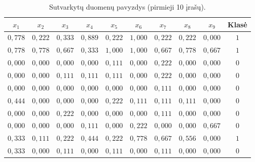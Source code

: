 \begin{table}[H]
    \centering
    \caption{Sutvarkytų duomenų pavyzdys (pirmieji 10 įrašų).}
    \begin{tabular}{|c|c|c|c|c|c|c|c|c|c|}
        \hline
        $x_1$ & $x_2$ & $x_3$ & $x_4$ & $x_5$ & $x_6$ & $x_7$ & $x_8$ & $x_9$ & Klasė \\
        \hline
        $0{,}778$ & $0{,}222$ & $0{,}333$ & $0{,}889$ & $0{,}222$ & $1{,}000$ & $0{,}222$ & $0{,}222$ & $0{,}000$ & $1$ \\ \hline
        $0{,}778$ & $0{,}778$ & $0{,}667$ & $0{,}333$ & $1{,}000$ & $1{,}000$ & $0{,}667$ & $0{,}778$ & $0{,}667$ & $1$ \\ \hline
        $0{,}000$ & $0{,}000$ & $0{,}000$ & $0{,}000$ & $0{,}111$ & $0{,}000$ & $0{,}222$ & $0{,}000$ & $0{,}000$ & $0$ \\ \hline
        $0{,}000$ & $0{,}000$ & $0{,}111$ & $0{,}111$ & $0{,}111$ & $0{,}000$ & $0{,}222$ & $0{,}000$ & $0{,}000$ & $0$ \\ \hline
        $0{,}000$ & $0{,}000$ & $0{,}000$ & $0{,}000$ & $0{,}000$ & $0{,}000$ & $0{,}111$ & $0{,}000$ & $0{,}000$ & $0$ \\ \hline
        $0{,}444$ & $0{,}000$ & $0{,}000$ & $0{,}000$ & $0{,}222$ & $0{,}111$ & $0{,}111$ & $0{,}111$ & $0{,}000$ & $0$ \\ \hline
        $0{,}000$ & $0{,}000$ & $0{,}222$ & $0{,}000$ & $0{,}000$ & $0{,}000$ & $0{,}111$ & $0{,}000$ & $0{,}000$ & $0$ \\ \hline
        $0{,}000$ & $0{,}000$ & $0{,}000$ & $0{,}111$ & $0{,}000$ & $0{,}222$ & $0{,}000$ & $0{,}000$ & $0{,}667$ & $0$ \\ \hline
        $0{,}333$ & $0{,}111$ & $0{,}222$ & $0{,}444$ & $0{,}222$ & $0{,}778$ & $0{,}667$ & $0{,}556$ & $0{,}000$ & $1$ \\ \hline
        $0{,}333$ & $0{,}000$ & $0{,}111$ & $0{,}000$ & $0{,}111$ & $0{,}000$ & $0{,}111$ & $0{,}000$ & $0{,}000$ & $0$ \\ \hline
    \end{tabular}
    \label{tab:sutvarkyti_duomenys}
\end{table}